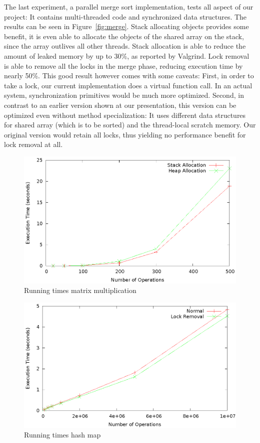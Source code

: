 \documentclass[letterpaper]{article}
\begin{document}
The last experiment, a parallel merge sort implementation, tests all aspect of our project: It contains multi-threaded code and synchronized
data structures. The results can be seen in Figure~\ref{fig:merge}. Stack allocating objects provides some benefit, it is even
able to allocate the objects of the shared array on the stack, since the array outlives all other threads. 
Stack allocation is able to reduce the amount of leaked memory by up to 30\%, as reported by Valgrind.
Lock removal is able to remove all the locks in the merge phase, reducing execution time by nearly 50\%. This
good result however comes with some caveats: First, in order to take a lock, our current implementation does a virtual function call. In
an actual system, synchronization primitives would be much more optimized. Second, in contrast to an earlier version shown at our
presentation, this version can be optimized even without method specialization: It uses different data structures for shared array
(which is to be sorted) and the thread-local scratch memory.
Our original version would retain all locks, thus yielding no performance benefit for lock removal at all.


\begin{figure} \center
 \includegraphics[width=0.8\linewidth]{results_matrix_mul.eps}
  \caption{Running times matrix multiplication}
  \label{fig:matrixmul}
\end{figure}

\begin{figure} \center
 \includegraphics[width=0.8\linewidth]{results_hash.eps}
  \caption{Running times hash map}
  \label{fig:hash}
\end{figure}
\end{document}
